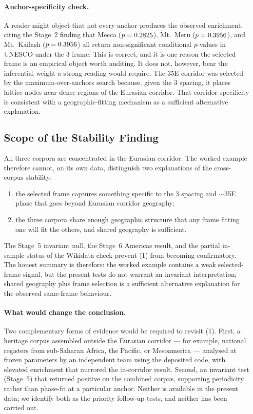 \documentclass[12pt,a4paper]{article}
\newcommand{\degr}{\ifmmode{^\circ}\else\textdegree{}\fi}
\begin{document}
\paragraph{Anchor-specificity check.} A reader might object that not
every anchor produces the observed enrichment, citing the Stage~2
finding that Mecca ($p = 0.2825$), Mt.~Meru
($p = 0.3956$), and Mt.~Kailash ($p = 0.3956$) all
return non-significant conditional $p$-values in UNESCO under the
3\degr{} frame. This is correct, and it is one reason the selected
frame is an empirical object worth auditing. It does not, however,
bear the inferential weight a strong reading would require. The
35\degr{}E corridor was selected by the maximum-over-anchors search
because, given the 3\degr{} spacing, it places lattice nodes near dense
regions of the Eurasian corridor. That corridor specificity is
consistent with a geographic-fitting mechanism as a sufficient
alternative explanation.

\subsection{Scope of the Stability Finding}
\label{sec:cross_corpus_scope}

All three corpora are concentrated in the Eurasian corridor. The
worked example therefore cannot, on its own data, distinguish two
explanations of the cross-corpus stability:
\begin{enumerate}
  \item the selected frame captures something specific to the
        3\degr{} spacing and $\sim$35\degr{}E phase that goes beyond
        Eurasian corridor geography;
  \item the three corpora share enough geographic structure that any
        frame fitting one will fit the others, and shared geography
        is sufficient.
\end{enumerate}
The Stage~5 invariant null, the Stage~6 Americas result, and the
partial in-sample status of the Wikidata check prevent (1) from
becoming confirmatory. The honest summary is therefore: the worked
example contains a weak selected-frame signal, but the present tests
do not warrant an invariant interpretation; shared geography plus frame
selection is a sufficient alternative explanation for the observed
same-frame behaviour.

\paragraph{What would change the conclusion.} Two complementary forms
of evidence would be required to revisit (1). First, a heritage
corpus assembled outside the Eurasian corridor --- for example,
national registers from sub-Saharan Africa, the Pacific, or
Mesoamerica --- analysed at frozen parameters by an independent team
using the deposited code, with elevated enrichment that mirrored the
in-corridor result. Second, an invariant test (Stage~5) that returned
positive on the combined corpus, supporting periodicity rather than
phase-fit at a particular anchor. Neither is available in the present
data; we identify both as the priority follow-up tests, and neither
has been carried out.
\end{document}
